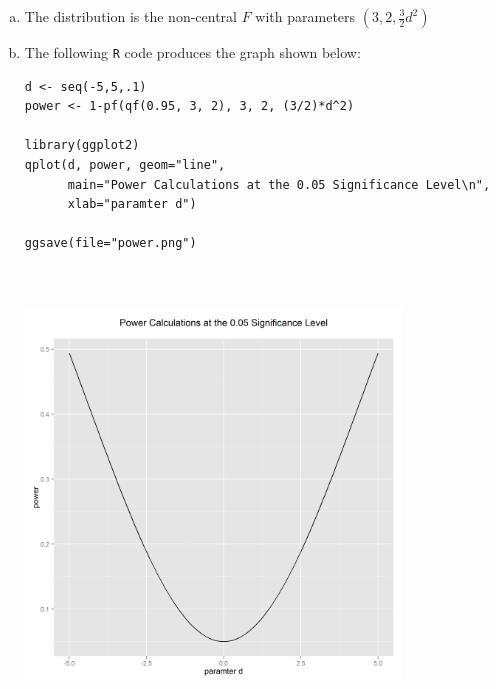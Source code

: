 \documentclass[paper=a4, fontsize=11pt]{scrartcl} %
\begin{document}
\vspace{5mm}
\begin{enumerate}[(a)]

\item The distribution is the non-central $F$ with parameters $(3, 2, \frac{3}{2} d^2)$

\item The following \texttt{R} code produces the graph shown below:
\begin{lstlisting}[basicstyle=\ttfamily\small\bfseries]
d <- seq(-5,5,.1)
power <- 1-pf(qf(0.95, 3, 2), 3, 2, (3/2)*d^2)

library(ggplot2)
qplot(d, power, geom="line", 
      main="Power Calculations at the 0.05 Significance Level\n",
      xlab="paramter d")

ggsave(file="power.png")
\end{lstlisting}

\begin{center}
\includegraphics[width=10cm, height=12cm, width= 12cm]{power}
\end{center} 

\end{enumerate}

\bigskip
\bigskip
\end{document}
